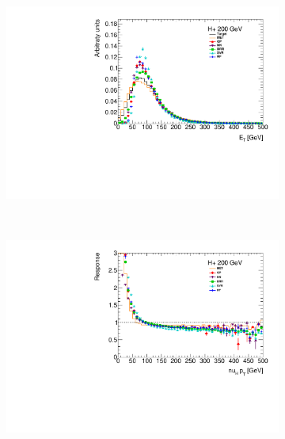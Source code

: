 \documentclass[twocolumn]{scrartcl}
\begin{document}
\begin{figure}
    \centering
    \begin{subfigure}{.48\textwidth}
        \includegraphics[width=\textwidth]{plots/pt_200.pdf}
    \end{subfigure}
    ~
    \begin{subfigure}{.48\textwidth}
        \includegraphics[width=\textwidth]{plots/profile_200.pdf}
    \end{subfigure}


\end{figure}
\end{document}
